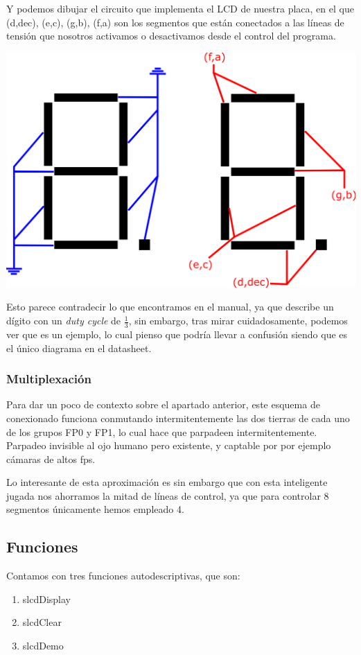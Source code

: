 \documentclass[a4paper,openright,12pt]{article}
\begin{document}
Y podemos dibujar el circuito que implementa el LCD de nuestra placa, en el que (d,dec), (e,c), (g,b), (f,a) son los segmentos que están conectados a las líneas de
tensión que nosotros activamos o desactivamos desde el control del programa.
\begin{center}
\includegraphics[scale=0.5]{img/digits.png}
\end{center}

Esto parece contradecir lo que encontramos en el manual, ya que describe un dígito con un \emph{duty cycle} de $\frac{1}{3}$, sin embargo, tras mirar cuidadosamente, podemos ver que
es un ejemplo, lo cual pienso que podría llevar a confusión siendo que es el único diagrama en el datasheet. \autocite[919]{KL46manual}

\subsubsection{Multiplexación}
Para dar un poco de contexto sobre el apartado anterior, este esquema de conexionado funciona conmutando intermitentemente las dos tierras de cada uno de los grupos FP0 y FP1, lo cual
hace que parpadeen intermitentemente. Parpadeo invisible al ojo humano pero existente, y captable por por ejemplo cámaras de altos fps.

Lo interesante de esta aproximación es sin embargo que con esta inteligente jugada nos ahorramos la mitad de líneas de control, ya que para controlar 8 segmentos únicamente hemos empleado 4.

\subsection{Funciones}
Contamos con tres funciones autodescriptivas, que son:
\begin{enumerate}[a]
    \item slcdDisplay   \label{otras_func_slcdDisplay}
    \item slcdClear     \label{otras_func_slcdClear}
    \item slcdDemo      \label{otras_func_slcdDemo}
\end{enumerate}
\end{document}

